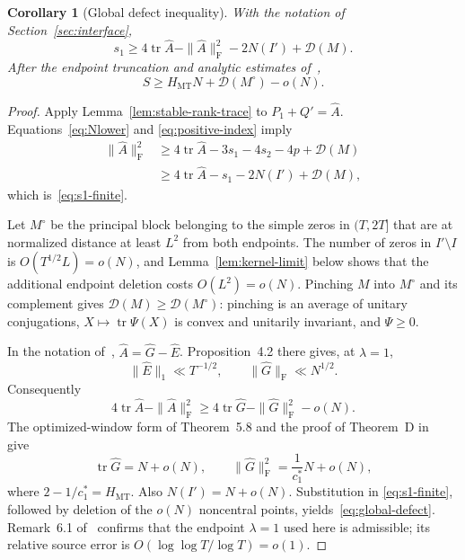 \documentclass[11pt]{article}
\newtheorem{corollary}[theorem]{Corollary}
\DeclareMathOperator{\tr}{tr}
\newcommand{\Frob}{\mathrm F}
\newcommand{\cD}{\mathcal D}
\newcommand{\MT}{\mathrm{MT}}
\begin{document}
\begin{corollary}[Global defect inequality]\label{cor:global-defect}
With the notation of Section~\ref{sec:interface},
\begin{equation}\label{eq:s1-finite}
 s_1\ge4\tr\widehat A-\|\widehat A\|_{\Frob}^2
 -2N(I')+\cD(M).
\end{equation}
After the endpoint truncation and analytic estimates of~\cite{Claude26},
\begin{equation}\label{eq:global-defect}
 S\ge H_{\MT}N+\cD(M^\circ)-o(N).
\end{equation}
\end{corollary}

\begin{proof}
Apply Lemma~\ref{lem:stable-rank-trace} to
$P_1+Q'=\widehat A$.  Equations~\eqref{eq:Nlower} and
\eqref{eq:positive-index} imply
\begin{align*}
 \|\widehat A\|_{\Frob}^2
 &\ge4\tr\widehat A-3s_1-4s_2-4p+\cD(M)\\
 &\ge4\tr\widehat A-s_1-2N(I')+\cD(M),
\end{align*}
which is~\eqref{eq:s1-finite}.

Let $M^\circ$ be the principal block belonging to the simple zeros in
$(T,2T]$ that are at normalized distance at least $L^2$ from both endpoints.
The number of zeros in $I'\setminus I$ is $O(T^{1/2}L)=o(N)$, and
Lemma~\ref{lem:kernel-limit} below shows that the additional endpoint
deletion costs $O(L^2)=o(N)$.  Pinching $M$ into $M^\circ$ and its complement
gives $\cD(M)\ge\cD(M^\circ)$: pinching is an average of unitary
conjugations, $X\mapsto\tr\Psi(X)$ is convex and unitarily invariant, and
$\Psi\ge0$.

In the notation of~\cite[Equation~(4.4)]{Claude26},
$\widehat A=\widehat G-\widehat E$.  Proposition~4.2 there gives, at
$\lambda=1$,
\[
 \|\widehat E\|_1\ll T^{-1/2},
 \qquad \|\widehat G\|_{\Frob}\ll N^{1/2}.
\]
Consequently
\[
 4\tr\widehat A-\|\widehat A\|_{\Frob}^2
 \ge4\tr\widehat G-\|\widehat G\|_{\Frob}^2-o(N).
\]
The optimized-window form of Theorem~5.8 and the proof of Theorem~D
in~\cite{Claude26} give
\[
 \tr\widehat G=N+o(N),\qquad
 \|\widehat G\|_{\Frob}^2=\frac1{c_1^*}N+o(N),
\]
where $2-1/c_1^*=H_{\MT}$.  Also $N(I')=N+o(N)$.  Substitution in
\eqref{eq:s1-finite}, followed by deletion of the $o(N)$ noncentral points,
yields~\eqref{eq:global-defect}.  Remark~6.1 of~\cite{Claude26} confirms
that the endpoint $\lambda=1$ used here is admissible; its relative source
error is $O(\log\log T/\log T)=o(1)$.
\end{proof}
\end{document}
